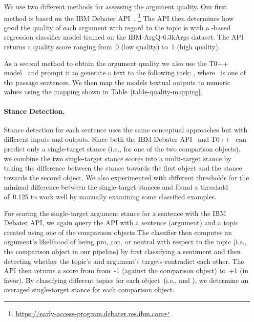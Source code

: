 We use two different methods for assessing the argument quality.
Our first method is based on the IBM Debater API~\cite{ToledoGCFVLJAS2019}.%
\footnote{\url{https://early-access-program.debater.res.ibm.com}}
The API then determines how good the quality of each argument with regard to the topic is with a \Bert-based~\cite{DevlinCLT2019} regression classifier model trained on the IBM-ArgQ-6.3kArgs dataset. The API returns a quality score ranging from~0 (low quality) to~1 (high quality).

As a second method to obtain the argument quality we also use the T0++ model~\cite{SanhWRBSACSLRDBXTSSKCNDCJWMSYPBWNRSSFFTBGBWR2021} and prompt it to generate a text to the following task: \hspace{.5em} , where ~is one of the passage sentences.
We then map the models textual outputs to numeric values using the mapping shown in Table~\ref{table-quality-mapping}.

\paragraph{Stance Detection.}

Stance detection for each sentence uses the same conceptual approaches but with different inputs and outputs.
Since both the IBM Debater API~\cite{BarHaimBDSS2017} and  T0++~\cite{SanhWRBSACSLRDBXTSSKCNDCJWMSYPBWNRSSFFTBGBWR2021} can predict only a single-target stance (i.e., for one of the two comparison objects), we combine the two single-target stance scores into a multi-target stance by taking the difference between the stance towards the first object and the stance towards the second object.
We also experimented with different thresholds for the minimal difference between the single-target stances and found a threshold of~0.125 to work well by manually examining some classified examples.

For scoring the single-target argument stance for a sentence with the IBM Debater API, we again query the API with a sentence (argument) and a topic created using one of the comparison objects
The classifier \cite{BarHaimBDSS2017} then computes an argument's likelihood of being pro, con, or neutral with respect to the topic (i.e., the comparison object in our pipeline) by first classifying a sentiment and then detecting whether the topic's and argument's targets contradict each other.
The API then returns a score from from~-1 (against the comparison object) to~+1 (in favor).
By classifying different topics for each object~(i.e.,  and ), we determine an averaged single-target stance for each comparison object.

